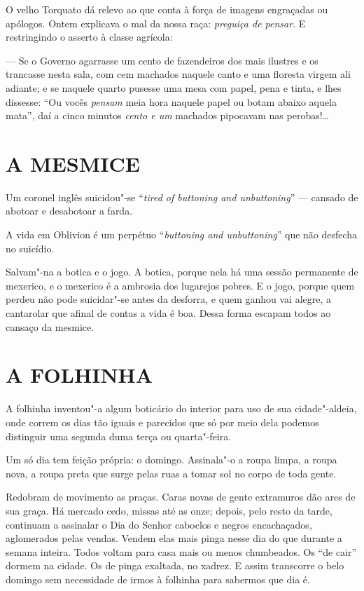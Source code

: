 \noindent{}O velho Torquato dá relevo ao que conta à força de imagens engraçadas ou
apólogos. Ontem explicava o mal da nossa raça: \emph{preguiça de
pensar}. E restringindo o asserto à classe agrícola:

--- Se o Governo agarrasse um cento de fazendeiros dos mais ilustres e
os trancasse nesta sala, com cem machados naquele canto e uma floresta
virgem ali adiante; e se naquele quarto pusesse uma mesa com papel, pena
e tinta, e lhes dissesse: ``Ou vocês \emph{pensam} meia hora naquele
papel ou botam abaixo aquela mata'', daí a cinco minutos \emph{cento e
um} machados pipocavam nas perobas!\ldots{}

\section*{A MESMICE}

Um coronel inglês suicidou"-se ``\emph{tired of buttoning and
unbuttoning}'' --- cansado de abotoar e desabotoar a farda.

A vida em Oblivion é um perpétuo ``\emph{buttoning and unbuttoning}''
que não desfecha no suicídio.

Salvam"-na a botica e o jogo. A botica, porque nela há uma sessão
permanente de mexerico, e o mexerico é a ambrosia dos lugarejos pobres.
E o jogo, porque quem perdeu não pode suicidar"-se antes da desforra, e
quem ganhou vai alegre, a cantarolar que afinal de contas a vida é boa.
Dessa forma escapam todos ao cansaço da mesmice.

\section*{A FOLHINHA}

A folhinha inventou"-a algum boticário do interior para uso de sua
cidade"-aldeia, onde correm os dias tão iguais e parecidos que só por
meio dela podemos distinguir uma segunda duma terça ou quarta"-feira.

Um só dia tem feição própria: o domingo. Assinala"-o a roupa limpa, a
roupa nova, a roupa preta que surge pelas ruas a tomar sol no corpo de
toda gente.

Redobram de movimento as praças. Caras novas de gente extramuros dão
ares de sua graça. Há mercado cedo, missas até as onze; depois, pelo
resto da tarde, continuam a assinalar o Dia do Senhor caboclos e negros
encachaçados, aglomerados pelas vendas. Vendem elas mais pinga nesse dia
do que durante a semana inteira. Todos voltam para casa mais ou menos
chumbeados. Os ``de cair'' dormem na cidade. Os de pinga exaltada, no
xadrez. E assim transcorre o belo domingo sem necessidade de irmos à
folhinha para sabermos que dia é.

